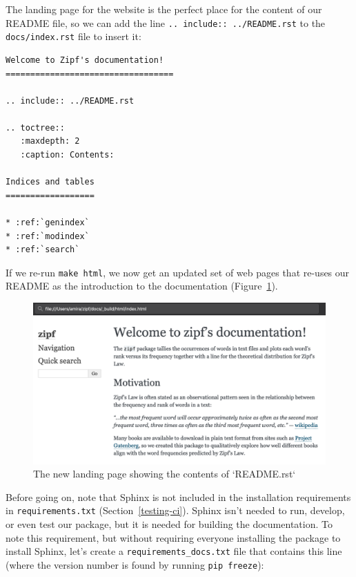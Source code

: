 \documentclass[
]{krantz}
\begin{document}
The landing page for the website is the perfect place for the content of our README file,
so we can add the line \texttt{..\ include::\ ../README.rst} to the \texttt{docs/index.rst} file to insert it:

\begin{verbatim}
Welcome to Zipf's documentation!
==================================

.. include:: ../README.rst

.. toctree::
   :maxdepth: 2
   :caption: Contents:

Indices and tables
==================

* :ref:`genindex`
* :ref:`modindex`
* :ref:`search`
\end{verbatim}

If we re-run \texttt{make\ html},
we now get an updated set of web pages that
re-uses our README as the introduction to the documentation (Figure~\ref{fig:packaging-sphinx-landing-page}).

\begin{figure}

{\centering \includegraphics[width=1\linewidth]{figures/packaging/landing-page} 

}

\caption{The new landing page showing the contents of `README.rst`}\label{fig:packaging-sphinx-landing-page}
\end{figure}

Before going on,
note that Sphinx is not included in the installation requirements in \texttt{requirements.txt} (Section~\ref{testing-ci}).
Sphinx isn't needed to run, develop, or even test our package,
but it is needed for building the documentation.
To note this requirement,
but without requiring everyone installing the package to install Sphinx,
let's create a \texttt{requirements\_docs.txt} file that contains this line
(where the version number is found by running \texttt{pip\ freeze}):
\end{document}
